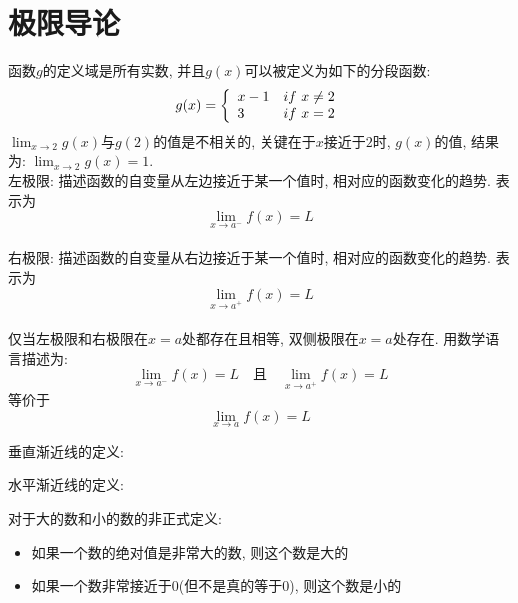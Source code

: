 \chapter{极限导论}
\phantom{空格}函数$g$的定义域是所有实数, 并且$g(x)$可以被定义为如下的分段函数:\\
\[
	g(x)=\left\{
	\begin{array}{l l}
		x-1 & if\ x\neq2\\
		3 & if\ x=2
	\end{array}
	\right.
\]
$\lim_{x\to2}g(x)$与$g(2)$的值是不相关的, 关键在于$x$接近于$2$时, $g(x)$的值, 结果为: $\lim_{x\to2}g(x)=1$.\\
\phantom{空格}左极限: 描述函数的自变量从左边接近于某一个值时, 相对应的函数变化的趋势. 表示为
\[\lim_{x\to a^-}f(x)=L\]\\
\phantom{空格}右极限: 描述函数的自变量从右边接近于某一个值时, 相对应的函数变化的趋势. 表示为
\[\lim_{x\to a^+}f(x)=L\]\\
仅当左极限和右极限在$x=a$处都存在且相等, 双侧极限在$x=a$处存在. 用数学语言描述为:\\
\[\lim_{x\to a^-}f(x)=L\quad\text{且}\quad\lim_{x\to a^+}f(x)=L\]
等价于
\[\lim_{x\to a}f(x)=L\]

垂直渐近线的定义:
{\par\centering
{}
\par}\vspace{4ex}

水平渐近线的定义:
{\par\centering
{}
\par}\vspace{4ex}

对于大的数和小的数的非正式定义:
\begin{itemize}
		\item 如果一个数的绝对值是非常大的数, 则这个数是大的
		\item 如果一个数非常接近于0(但不是真的等于0), 则这个数是小的
\end{itemize}\vspace{4ex}

